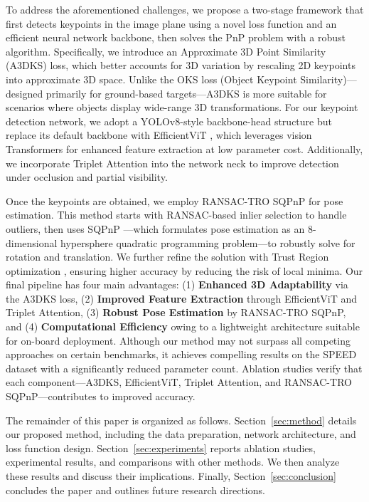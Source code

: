 \documentclass[a4paper,fleqn]{cas-sc}
\begin{document}
To address the aforementioned challenges, we propose a two-stage framework that first detects keypoints in the image plane using a novel loss function and an efficient neural network backbone, then solves the PnP problem with a robust algorithm. Specifically, we introduce an Approximate 3D Point Similarity (A3DKS) loss, which better accounts for 3D variation by rescaling 2D keypoints into approximate 3D space. Unlike the OKS loss (Object Keypoint Similarity)—designed primarily for ground-based targets—A3DKS is more suitable for scenarios where objects display wide-range 3D transformations. For our keypoint detection network, we adopt a YOLOv8-style backbone-head structure but replace its default backbone with EfficientViT \citep{liu2023efficientvit}, which leverages vision Transformers for enhanced feature extraction at low parameter cost. Additionally, we incorporate Triplet Attention \citep{triplet} into the network neck to improve detection under occlusion and partial visibility. 

Once the keypoints are obtained, we employ RANSAC-TRO SQPnP for pose estimation. This method starts with RANSAC-based inlier selection to handle outliers, then uses SQPnP \citep{terzakis2020consistently}—which formulates pose estimation as an 8-dimensional hypersphere quadratic programming problem—to robustly solve for rotation and translation. We further refine the solution with Trust Region optimization \citep{trf}, ensuring higher accuracy by reducing the risk of local minima. Our final pipeline has four main advantages: (1) \textbf{Enhanced 3D Adaptability} via the A3DKS loss, (2) \textbf{Improved Feature Extraction} through EfficientViT and Triplet Attention, (3) \textbf{Robust Pose Estimation} by RANSAC-TRO SQPnP, and (4) \textbf{Computational Efficiency} owing to a lightweight architecture suitable for on-board deployment. Although our method may not surpass all competing approaches on certain benchmarks, it achieves compelling results on the SPEED dataset with a significantly reduced parameter count. Ablation studies verify that each component—A3DKS, EfficientViT, Triplet Attention, and RANSAC-TRO SQPnP—contributes to improved accuracy. 

The remainder of this paper is organized as follows. Section~\ref{sec:method} details our proposed method, including the data preparation, network architecture, and loss function design. Section~\ref{sec:experiments} reports ablation studies, experimental results, and comparisons with other methods. We then analyze these results and discuss their implications. Finally, Section~\ref{sec:conclusion} concludes the paper and outlines future research directions.
\end{document}
